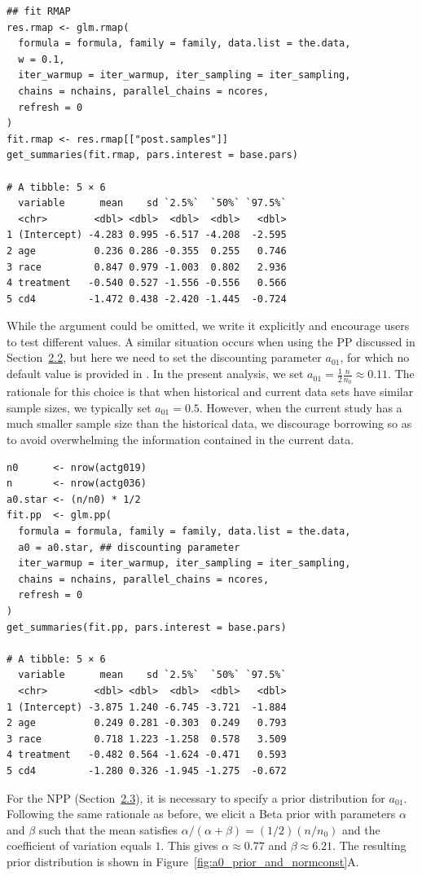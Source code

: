 \begin{verbatim}
## fit RMAP
res.rmap <- glm.rmap(
  formula = formula, family = family, data.list = the.data,
  w = 0.1,
  iter_warmup = iter_warmup, iter_sampling = iter_sampling,
  chains = nchains, parallel_chains = ncores,
  refresh = 0
)
fit.rmap <- res.rmap[["post.samples"]]
get_summaries(fit.rmap, pars.interest = base.pars)

# A tibble: 5 × 6
  variable      mean    sd `2.5%`  `50%` `97.5%`
  <chr>        <dbl> <dbl>  <dbl>  <dbl>   <dbl>
1 (Intercept) -4.283 0.995 -6.517 -4.208  -2.595
2 age          0.236 0.286 -0.355  0.255   0.746
3 race         0.847 0.979 -1.003  0.802   2.936
4 treatment   -0.540 0.527 -1.556 -0.556   0.566
5 cd4         -1.472 0.438 -2.420 -1.445  -0.724
\end{verbatim}
While the argument  could be omitted, we write it explicitly and encourage users to test different values.
A similar situation occurs when using the PP discussed in Section~\hyperref[sec:pp]{2.2}, but here we need to set the discounting parameter $a_{01}$, for which no default value is provided in .
In the present analysis, we set $a_{01} = \frac{1}{2}\frac{n}{n_0} \approx 0.11$. The rationale for this choice is that when historical and current data sets have similar sample sizes, we typically set $a_{01} = 0.5$. However, when the current study has a much smaller sample size than the historical data, we discourage borrowing so as to avoid overwhelming the information contained in the current data. 

\begin{verbatim}
n0      <- nrow(actg019)
n       <- nrow(actg036)
a0.star <- (n/n0) * 1/2
fit.pp  <- glm.pp(
  formula = formula, family = family, data.list = the.data,
  a0 = a0.star, ## discounting parameter
  iter_warmup = iter_warmup, iter_sampling = iter_sampling,
  chains = nchains, parallel_chains = ncores,
  refresh = 0
)
get_summaries(fit.pp, pars.interest = base.pars)

# A tibble: 5 × 6
  variable      mean    sd `2.5%`  `50%` `97.5%`
  <chr>        <dbl> <dbl>  <dbl>  <dbl>   <dbl>
1 (Intercept) -3.875 1.240 -6.745 -3.721  -1.884
2 age          0.249 0.281 -0.303  0.249   0.793
3 race         0.718 1.223 -1.258  0.578   3.509
4 treatment   -0.482 0.564 -1.624 -0.471   0.593
5 cd4         -1.280 0.326 -1.945 -1.275  -0.672
\end{verbatim}

For the NPP (Section~\hyperref[sec:npp]{2.3}), it is necessary to specify a prior distribution for $a_{01}$. Following the same rationale as before, we elicit a Beta prior with parameters $\alpha$ and $\beta$ such that the mean satisfies $\alpha/(\alpha + \beta) = (1/2)(n/n_0)$ and the coefficient of variation equals $1$.
This gives $\alpha \approx 0.77$ and $\beta \approx 6.21$.
The resulting prior distribution is shown in Figure~\ref{fig:a0_prior_and_normconst}A.

